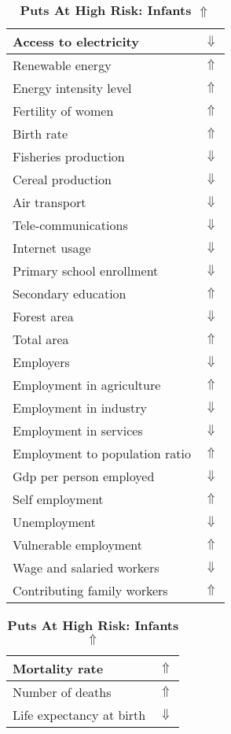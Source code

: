 \documentclass[12pt,notitlepage,oneside]{report}
\begin{document}
\begin{table}[!htb]
\caption{\textbf{Puts At High Risk: Infants $\Uparrow$}}
\centering
\label{Correlated Socio-economic Factors0}
\begin{tabular}{|l|l|}
\hline
Access to electricity & $\Downarrow$\\ \hline
Renewable energy & $\Uparrow$\\ \hline
Energy intensity level & $\Uparrow$\\ \hline
Fertility of women & $\Uparrow$\\ \hline
Birth rate & $\Uparrow$\\ \hline
Fisheries production & $\Downarrow$\\ \hline
Cereal production & $\Downarrow$\\ \hline
Air transport  & $\Downarrow$\\ \hline
Tele-communications & $\Downarrow$\\ \hline
Internet usage & $\Downarrow$\\ \hline
Primary school enrollment & $\Downarrow$\\ \hline
Secondary education & $\Uparrow$\\ \hline
Forest area & $\Downarrow$\\ \hline
Total area & $\Uparrow$\\ \hline
Employers & $\Downarrow$\\ \hline
Employment in agriculture & $\Uparrow$\\ \hline
Employment in industry & $\Downarrow$\\ \hline
Employment in services & $\Downarrow$\\ \hline
Employment to population ratio & $\Uparrow$\\ \hline
Gdp per person employed & $\Downarrow$\\ \hline
Self employment & $\Uparrow$\\ \hline
Unemployment & $\Downarrow$\\ \hline
Vulnerable employment & $\Uparrow$\\ \hline
Wage and salaried workers & $\Downarrow$\\ \hline
Contributing family workers & $\Uparrow$\\ \hline
\end{tabular}
\begin{tabular}{|l|l|}
\hline
Mortality rate & $\Uparrow$\\ \hline
Number of deaths & $\Uparrow$\\ \hline
Life expectancy at birth & $\Downarrow$\\ \hline

\end{tabular}
\end{table}
\end{document}
